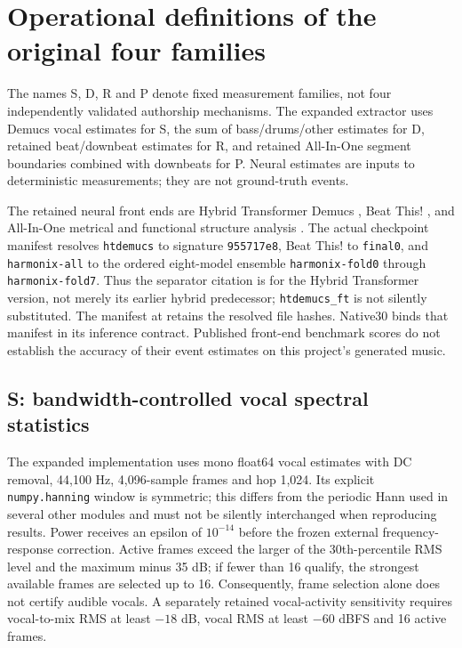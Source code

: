 \section{Operational definitions of the original four families}
\label{sec:sdrp-methods}

The names S, D, R and P denote fixed measurement families, not four
independently validated authorship mechanisms. The expanded extractor uses
Demucs vocal estimates for S, the sum of bass/drums/other estimates for D,
retained beat/downbeat estimates for R, and retained All-In-One segment
boundaries combined with downbeats for P. Neural estimates are inputs to
deterministic measurements; they are not ground-truth events.

The retained neural front ends are Hybrid Transformer Demucs
\cite{rouard2022}, Beat This! \cite{foscarin2024}, and All-In-One metrical
and functional structure analysis \cite{kimnam2023}. The actual checkpoint
manifest resolves \texttt{htdemucs} to signature \texttt{955717e8},
Beat This! to \texttt{final0}, and \texttt{harmonix-all} to the ordered
eight-model ensemble \texttt{harmonix-fold0} through \texttt{harmonix-fold7}.
Thus the separator citation is for the Hybrid Transformer version, not
merely its earlier hybrid predecessor; \texttt{htdemucs\_ft} is not silently
substituted. The manifest at
retains the resolved file hashes. Native30 binds that manifest in its
inference contract. Published front-end benchmark scores do not establish
the accuracy of their event estimates on this project's generated music.

\subsection{S: bandwidth-controlled vocal spectral statistics}
The expanded implementation uses mono float64 vocal estimates with DC
removal, 44,100 Hz, 4,096-sample frames and hop 1,024. Its explicit
\texttt{numpy.hanning} window is symmetric; this differs from the periodic
Hann used in several other modules and must not be silently interchanged
when reproducing results. Power receives an epsilon of $10^{-14}$ before
the frozen external frequency-response correction. Active frames exceed
the larger of the 30th-percentile RMS level and the maximum minus 35 dB;
if fewer than 16 qualify, the strongest available frames are selected up
to 16. Consequently, frame selection alone does not certify audible vocals.
A separately retained vocal-activity sensitivity requires vocal-to-mix RMS
at least $-18$ dB, vocal RMS at least $-60$ dBFS and 16 active frames.

